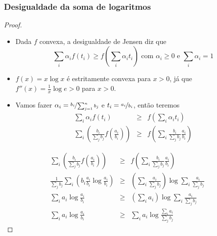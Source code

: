 \begin{frame}[allowframebreaks]
  \frametitle{Desigualdade da soma de logaritmos}
  \begin{proof}
        \begin{itemize}
        \item Dada $f$ convexa, a desigualdade de Jensen diz que
          \begin{equation}
          \sum_i \alpha_i f(t_i) \geq f \left( \sum_i \alpha_i t_i \right) \text{ com } \alpha_i \geq 0 \text{ e } \sum_i \alpha_i = 1
          \end{equation}

        \item $f(x) = x \log x$ é estritamente convexa para $x>0$, já que 
                $f''(x)=\frac{1}{x} \log e > 0$ para $x>0$.

        \end{itemize}
        \proofbreak
        \begin{itemize}
        \item Vamos fazer $\alpha_i = \nicefrac{b_i}{\sum_{j=1}^n b_j}$ e $t_i = \nicefrac{a_i}{b_i}$, então teremos
        \begin{eqnarray}
        \sum_i \alpha_i f(t_i) &\geq& f \left( \sum_i \alpha_i t_i \right) \nonumber \\
        \sum_i \left( \frac{b_i}{\sum_j b_j} f \left( \frac{a_i}{b_i} \right) \right) &\geq&
                f \left( \sum_i \frac{b_i}{\sum_j b_j} \frac{a_i}{b_i} \right) \nonumber
        \end{eqnarray}
        \end{itemize}

   \proofbreak
   \vspace{-2ex}
   \begin{eqnarray}
        \sum_i \left( \frac{b_i}{\sum_j b_j} f \left( \frac{a_i}{b_i} \right) \right) &\geq&
                f \left( \sum_i \frac{b_i}{\sum_j b_j} \frac{a_i}{b_i} \right) \nonumber \\
        \frac{1}{\sum_j b_j} \sum_i \left( b_i \frac{a_i}{b_i} \log \frac{a_i}{b_i} \right) &\geq&
                \left( \sum_i \frac{a_i}{\sum_j b_j} \right) \log \sum_i \frac{a_i}{\sum_j b_j} \nonumber \\
        \sum_i a_i \log \frac{a_i}{b_i} &\geq& \left( \sum_i a_i \right) \log \sum_i \frac{a_i}{\sum_j b_j} \nonumber \\
        \sum_i a_i \log \frac{a_i}{b_i} &\geq& \sum_i a_i \log \frac{\sum_i a_i}{\sum_j b_j}
   \end{eqnarray}

  \end{proof}
\end{frame}


